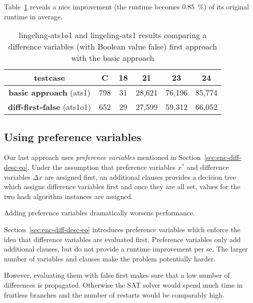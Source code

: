 Table~\ref{tab:diff-first-false-results} reveals a nice improvement (the runtime
becomes 0.85~\%) of its original runtime in average.

\begin{table}[!h]
  \begin{center}
    \begin{tabular}{c|c|cccc}
      \textbf{testcase}                   & \textbf{C} & \textbf{18} & \textbf{21} & \textbf{23} & \textbf{24} \\
    \hline
      \textbf{basic approach}      (ats1) &        798 &          31 &      28,621 &      76,196 &      85,774 \\
      \textbf{diff-first-false}  (ats1o1) &        652 &          29 &      27,599 &      59,312 &      66,052
    \end{tabular}
    \caption[Difference variables first (with Boolean value false) results]{
      lingeling-ats1o1 and lingeling-ats1 results
      comparing a difference variables (with Boolean value false) first approach
      with the basic approach
    }
    \label{tab:diff-first-false-results}
  \end{center}
\end{table}

\subsection{Using preference variables}
\label{sec:preference-variables}
%
Our last approach uses \emph{preference variables} mentioned in
Section~\ref{sec:enc-diff-desc-eo}. Under the assumption that
preference variables $x^*$ and difference variables $\Delta x$
are assigned first, an additional clauses provides a decision tree
which assigns difference variables first and once they are all set,
values for the two hash algorithm instances are assigned.

\begin{prop}
  Adding preference variables dramatically worsens performance.
\end{prop}
%
Section~\ref{sec:enc-diff-desc-eo} introduces preference variables
which enforce the idea that difference variables are evaluated first.
Preference variables only add additional clauses, but do not provide
a runtime improvement per se. The larger number of variables and
clauses make the problem potentially harder.

However, evaluating them with false first makes sure that a low
number of differences is propagated. Otherwise the SAT solver would
spend much time in fruitless branches and the number of restarts
would be comparably high.

